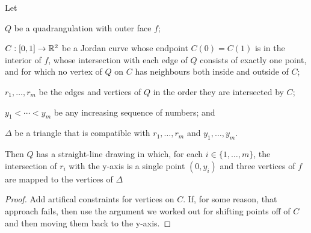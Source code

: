 \documentclass{patmorin}
\begin{document}
\begin{lem}
    Let
    \begin{compactitem}
    \item $Q$ be a quadrangulation with outer face $f$; 
    \item $C:[0,1]\to\mathbb{R}^2$ be a Jordan curve
     whose endpoint $C(0)=C(1)$ is in the interior of $f$,
     whose intersection with each edge of $Q$
     consists of exactly one point, and for which no vertex of $Q$ on $C$
     has neighbours both inside and outside of $C$;
    \item $r_1,\ldots,r_m$ be the edges and vertices of $Q$ in the
    order they are intersected by $C$; 
    \item $y_1<\cdots<y_m$
    be any increasing sequence of numbers; and
    \item $\Delta$ be a triangle that is compatible with $r_1,\ldots,r_m$ and $y_1,\ldots,y_m$.
    \end{compactitem}
    Then $Q$ has a straight-line
    drawing in which, for each $i\in\{1,\ldots,m\}$, the intersection
    of $r_i$ with the y-axis is a single point $(0,y_i)$ and three vertices
    of $f$ are mapped to the vertices of $\Delta$
\end{lem}

\begin{proof}
  Add artifical constraints for vertices on $C$.  If, for some reason, that approach fails, then use the argument we worked out for shifting points off of $C$ and then moving them back to the y-axis.
\end{proof}
\end{document}
